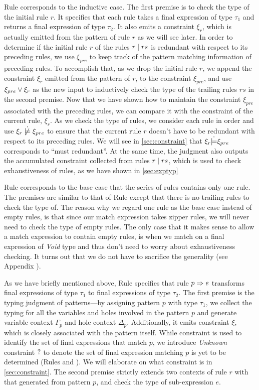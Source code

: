 Rule \TRules corresponds to the inductive case. The first premise is to check
the type of the initial rule $r$. It specifies that each rule takes a final expression
of type $\tau_1$ and returns a final expression of type $\tau_2$. It also emits
a constraint $\xi_r$, which is actually emitted from the pattern of rule $r$ as
we will see later. In order to determine if the initial rule $r$ of the rules
$r \mid rs$ is redundant with respect to its preceding rules, we use
$\xi_{pre}$ to keep track of the pattern matching information of preceding
rules. To accomplish that, as we drop the initial rule $r$, we append the
constraint $\xi_r$ emitted from the pattern of $r$, to the constraint
$\xi_{pre}$, and use $\xi_{pre} \vee \xi_r$ as the new input to inductively check the type
of the trailing rules $rs$ in the second premise. Now that we have shown how to maintain the
constraint $\xi_{pre}$ associated with the preceding rules, we can compare it
with the constraint of the current rule, $\xi_r$. As we check the
type of rules, we consider each rule in order and use
$\cnotsatisfy{\xi_r}{\xi_{pre}}$ to ensure that the current rule $r$ doesn't
have to be redundant with respect to its preceding rules. We will see in
\autoref{sec:constraint} that $\xi_r \dot{\models} \xi_{pre}$ corresponds to
``must redundant''. At the same time, the judgment also outputs the accumulated
constraint collected from rules $r \mid rs$, which is used to check
exhaustiveness of rules, as we have shown in \autoref{sec:exptyp}

Rule \TOneRules corresponds to the base case that the series of rules contains
only one rule. The premises are similar to that of Rule \TRules except that
there is no trailing rules to check the type of. The reason why we regard one
rule as the base case instead of empty rules, is that since our match expression
takes zipper rules, we will never need to check the type of empty rules. The
only case that it makes sense to allow a match expression to contain empty
rules, is when we match on a final expression of \textit{Void} type and thus
don't need to worry about exhaustiveness checking. It turns out that we do not
have to sacrifice the generality (see Appendix ).

As we have briefly mentioned above, Rule \TRule specifies that rule
$p \Rightarrow e$ transforms final expressions of type $\tau_1$ to final expressions
of type $\tau_2$. The first premise is the typing judgment of patterns---by
assigning pattern $p$ with type $\tau_1$, we collect the typing for all the
variables and holes involved in the pattern $p$ and generate variable context
$\Gamma_p$ and hole context $\Delta_p$. Additionally, it emits constraint $\xi$,
which is closely associated with the pattern itself. While constraint is used to
identify the set of final expressions that match $p$, we introduce
\textit{Unknown} constraint $\mathtt{?}$ to denote the set of final expression
matching $p$ is yet to be determined (Rules \PTEHole and \PTHole). We will elaborate on what constraint is in
\autoref{sec:constraint}. The second premise strictly extends two contexts of
rule $r$ with that generated from pattern $p$, and check the type of
sub-expression $e$.

